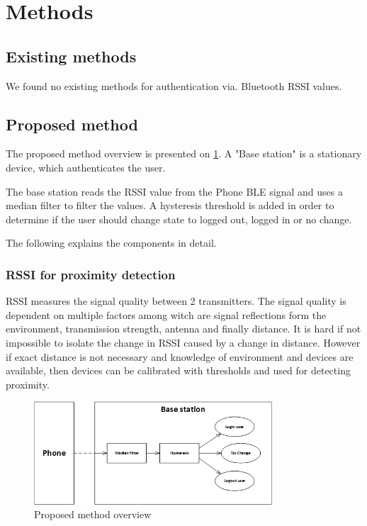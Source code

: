 \section{Methods}

\subsection{Existing methods}
We found no existing methods for authentication via. Bluetooth RSSI values.

\subsection{Proposed method}

The proposed method overview is presented on \cref{fig_solution_overview}. A "Base station" is a stationary device, which authenticates the user.

The base station reads the RSSI value from the Phone BLE signal and uses a median filter to filter the values. A hysteresis threshold is added in order to determine if the user should change state to logged out, logged in or no change.

The following explains the components in detail.

\subsubsection{RSSI for proximity detection}

RSSI measures the signal quality between 2 transmitters.
The signal quality is dependent on multiple factors among witch are signal reflections form the environment, transmission strength, antenna and finally distance. 
It is hard if not impossible to isolate the change in RSSI caused by a change in distance.
However if exact distance is not necessary and knowledge of environment and devices are available, then devices can be calibrated with thresholds and used for detecting proximity.


\begin{figure}[!t]
	\centering
	\includegraphics[width=3.5in]{img/SolutionOverview}
	\caption{ Proposed method overview }
	\label{fig_solution_overview}
\end{figure}

